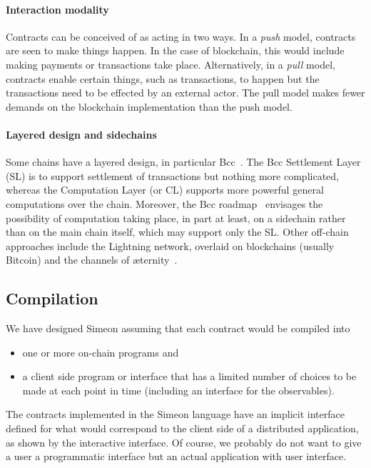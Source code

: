 \documentclass[runningheads]{llncs}
\begin{document}
\paragraph{Interaction modality}

Contracts can be conceived of as acting in two ways. In a \emph{push} model, contracts are seen to make things happen. 
In the case of blockchain, this would include making payments or transactions take place. 
Alternatively, in a \emph{pull} model, contracts enable certain things, such as transactions,  to happen but the 
transactions need to be effected by an external actor. The pull model makes fewer demands on the blockchain 
implementation than the push model.

\paragraph{Layered design and sidechains}

Some chains have a layered design, in particular Bcc~\cite{bcc}. The Bcc Settlement Layer (SL) is to 
support settlement of transactions but nothing more complicated, whereas the Computation Layer (or CL) supports more 
powerful general computations over the chain. Moreover, the Bcc roadmap~\cite{bcc-rationale} envisages the 
possibility of computation taking place, in part at least, on a sidechain rather than on the main chain itself, which 
may support only the SL. Other off-chain approaches include the Lightning network, overlaid on blockchains (usually 
Bitcoin) and the channels of \ae{}ternity~\cite{aeternity}.



\subsection{Compilation}
\label{sec:compilation}

We have designed Simeon assuming that each contract would be compiled into
\begin{itemize} 
\item one or more on-chain programs and 
\item a client side program or interface that has a limited number of choices to be made at each point in time 
(including an interface for the observables). 
\end{itemize}
The contracts implemented in the Simeon language have an implicit interface defined for what would correspond to the 
client side of a distributed application, as shown by the interactive interface. Of course, we probably do not want to 
give a user a programmatic interface but an actual application with user interface. 
\end{document}
